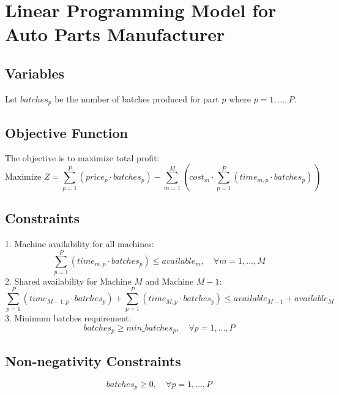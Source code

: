 \documentclass{article}
\begin{document}
\section*{Linear Programming Model for Auto Parts Manufacturer}

\subsection*{Variables}
Let \( batches_p \) be the number of batches produced for part \( p \) where \( p = 1, \ldots, P \).

\subsection*{Objective Function}
The objective is to maximize total profit:
\[
\text{Maximize } Z = \sum_{p=1}^{P} (price_p \cdot batches_p) - \sum_{m=1}^{M} (cost_m \cdot \sum_{p=1}^{P} (time_{m,p} \cdot batches_p))
\]

\subsection*{Constraints}
1. Machine availability for all machines:
\[
\sum_{p=1}^{P} (time_{m,p} \cdot batches_p) \leq available_m, \quad \forall m = 1, \ldots, M
\]
2. Shared availability for Machine \( M \) and Machine \( M-1 \):
\[
\sum_{p=1}^{P} (time_{M-1,p} \cdot batches_p) + \sum_{p=1}^{P} (time_{M,p} \cdot batches_p) \leq available_{M-1} + available_M
\]
3. Minimum batches requirement:
\[
batches_p \geq min\_batches_p, \quad \forall p = 1, \ldots, P
\]

\subsection*{Non-negativity Constraints}
\[
batches_p \geq 0, \quad \forall p = 1, \ldots, P
\]
\end{document}
